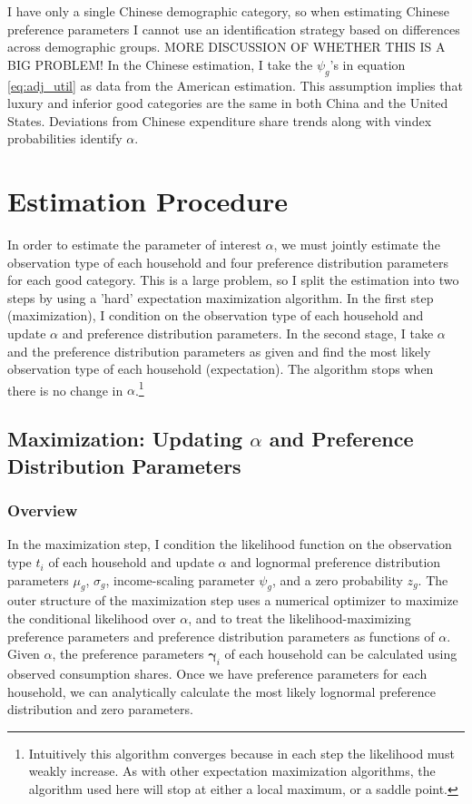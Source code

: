 \documentclass[12pt]{article}
\begin{document}
I have only a single Chinese demographic category, so when estimating Chinese preference parameters I cannot use an identification strategy based on differences across demographic groups.  MORE DISCUSSION OF WHETHER THIS IS A BIG PROBLEM!  In the Chinese estimation, I take the $\psi_g$'s in equation \eqref{eq:adj_util} as data from the American estimation.  This assumption implies that luxury and inferior good categories are the same in both China and the United States.  Deviations from Chinese expenditure share trends along with vindex probabilities identify $\alpha$.

\section{Estimation Procedure} 


In order to estimate the parameter of interest $\alpha$, we must jointly estimate the observation type of each household and four preference distribution parameters for each good category.  This is a large problem, so I split the estimation into two steps by using a 'hard' expectation maximization algorithm.  In the first step (maximization), I condition on the observation type of each household and update $\alpha$ and preference distribution parameters.  In the second stage, I take $\alpha$ and the preference distribution parameters as given and find the most likely observation type of each household (expectation).  The algorithm stops when there is no change in $\alpha$.\footnote{Intuitively this algorithm converges because in each step the likelihood must weakly increase.  As with other expectation maximization algorithms, the algorithm used here will stop at either a local maximum, or a saddle point.} 

\subsection{Maximization: Updating $\alpha$ and Preference Distribution Parameters} 

\subsubsection{Overview}
In the maximization step, I condition the likelihood function on the observation type $t_i$ of each household and update $\alpha$ and lognormal preference distribution parameters $\mu_g$, $\sigma_g$, income-scaling parameter $\psi_g$, and a zero probability $z_g$.  The outer structure of the maximization step uses a numerical optimizer to maximize the conditional likelihood over $\alpha$, and to treat the likelihood-maximizing preference parameters and preference distribution parameters as functions of $\alpha$.  Given $\alpha$, the preference parameters $\boldsymbol{\gamma}_i$ of each household can be calculated using observed consumption shares.  Once we have preference parameters for each household, we can analytically calculate the most likely lognormal preference distribution and zero parameters.
\end{document}
